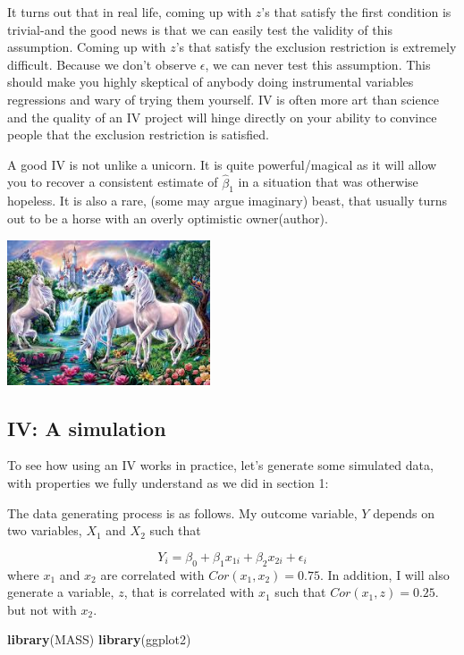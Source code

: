 \documentclass[
]{article}
\newenvironment{Shaded}{\begin{snugshade}}{\end{snugshade}}
\newcommand{\KeywordTok}[1]{\textcolor[rgb]{0.13,0.29,0.53}{\textbf{#1}}}
\newcommand{\NormalTok}[1]{#1}
\begin{document}
It turns out that in real life, coming up with \(z\)'s that satisfy the
first condition is trivial-and the good news is that we can easily test
the validity of this assumption. Coming up with \(z\)'s that satisfy the
exclusion restriction is extremely difficult. Because we don't observe
\(\epsilon\), we can never test this assumption. This should make you
highly skeptical of anybody doing instrumental variables regressions and
wary of trying them yourself. IV is often more art than science and the
quality of an IV project will hinge directly on your ability to convince
people that the exclusion restriction is satisfied.

A good IV is not unlike a unicorn. It is quite powerful/magical as it
will allow you to recover a consistent estimate of \(\hat{\beta}_1\) in
a situation that was otherwise hopeless. It is also a rare, (some may
argue imaginary) beast, that usually turns out to be a horse with an
overly optimistic owner(author).

\includegraphics[width=0.45\textwidth,height=\textheight]{"images/real_unicorn.jpg"}

\subsection{IV: A simulation}

To see how using an IV works in practice, let's generate some simulated
data, with properties we fully understand as we did in section 1:

The data generating process is as follows. My outcome variable, \(Y\)
depends on two variables, \(X_1\) and \(X_2\) such that

\[
Y_i=\beta_0+\beta_1 x_{1i}+\beta_2 x_{2i}+\epsilon_i
\] where \(x_1\) and \(x_2\) are correlated with \(Cor(x_1,x_2)=0.75\).
In addition, I will also generate a variable, \(z\), that is correlated
with \(x_1\) such that \(Cor(x_1,z)=0.25\). but not with \(x_2\).

\begin{Shaded}
\begin{Highlighting}[]
\KeywordTok{library}\NormalTok{(MASS)}
\KeywordTok{library}\NormalTok{(ggplot2)}
\end{Highlighting}
\end{Shaded}
\end{document}
